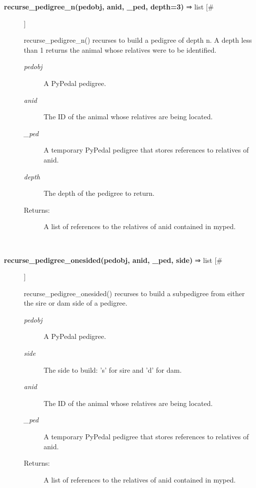 \begin{description}
\item[\textbf{recurse\_pedigree\_n(pedobj, anid, \_ped, depth=3)} ⇒ list [\#]
]
\par recurse\_pedigree\_n() recurses to build a pedigree of depth n.  A depth less than 1 returns
the animal whose relatives were to be identified.
\begin{description}
\item[\textit{pedobj}
]
A PyPedal pedigree.
\item[\textit{anid}
]
The ID of the animal whose relatives are being located.
\item[\textit{\_ped}
]
A temporary PyPedal pedigree that stores references to relatives of anid.
\item[\textit{depth}
]
The depth of the pedigree to return.
\item[Returns:
]
A list of references to the relatives of anid contained in myped.
\end{description}\\

\item[\textbf{recurse\_pedigree\_onesided(pedobj, anid, \_ped, side)} ⇒ list [\#]
]
\par recurse\_pedigree\_onesided() recurses to build a subpedigree from either the sire
or dam side of a pedigree.
\begin{description}
\item[\textit{pedobj}
]
A PyPedal pedigree.
\item[\textit{side}
]
The side to build: 's' for sire and 'd' for dam.
\item[\textit{anid}
]
The ID of the animal whose relatives are being located.
\item[\textit{\_ped}
]
A temporary PyPedal pedigree that stores references to relatives of anid.
\item[Returns:
]
A list of references to the relatives of anid contained in myped.
\end{description}\\

\end{description}
